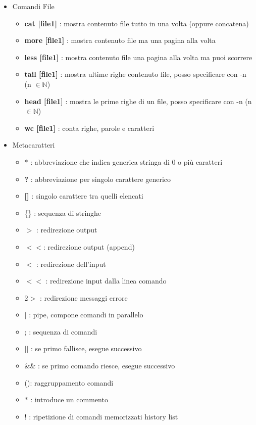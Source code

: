 \documentclass{article}
\begin{document}
\begin{itemize}
    \item Comandi File
    \begin{itemize} %
     
    
    \item \textbf{cat [file1]} : mostra contenuto file tutto in una volta (oppure concatena)
    \item \textbf{more [file1]} : mostra contenuto file ma una pagina alla volta
    \item \textbf{less [file1]} : mostra contenuto file una pagina alla volta ma puoi scorrere
    \item \textbf{tail  [file1]} : mostra ultime righe contenuto file, posso specificare con -n (n $\in \mathbb{N}$)
    \item \textbf{head [file1]} : mostra le prime righe di un file, posso specificare con -n (n $\in \mathbb{N}$)
    \item \textbf{wc [file1]} : conta righe, parole e caratteri
    \end{itemize} %

    \item Metacaratteri
        \begin{itemize} %
            \item $\mathbf{\ast}$ : abbreviazione che indica generica stringa di 0 o più caratteri
            \item \textbf{?} : abbreviazione per singolo carattere generico
            \item \textbf{[]} : singolo carattere tra quelli elencati
            \item \{\} : sequenza di stringhe
            \item $>$ : redirezione output
            \item $<<$: redirezione output (append)
            \item $<$ : redirezione dell'input
            \item $<<$ : redirezione input dalla linea comando
            \item $2>$ : redirezione messaggi errore
            \item $|$ : pipe, compone comandi in parallelo
            \item ; : sequenza di comandi
            \item $||$ : se primo fallisce, esegue successivo
            \item \&\& : se primo comando riesce, esegue successivo
            \item (): raggruppamento comandi
            \item $\ast$ : introduce un commento
            \item ! : ripetizione di comandi memorizzati history list
            


\end{itemize}
\end{itemize}
\end{document}
